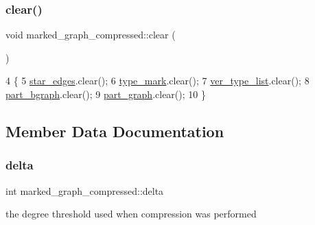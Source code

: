 \mbox{\label{classmarked__graph__compressed_af58307bfadcaa4c3ca6dd594c2f9b3a9}} 
\subsubsection{\texorpdfstring{clear()}{clear()}}
{\footnotesize\ttfamily void marked\+\_\+graph\+\_\+compressed\+::clear (\begin{DoxyParamCaption}{ }\end{DoxyParamCaption})}


\begin{DoxyCode}
4 \{
5   \hyperlink{classmarked__graph__compressed_a7df5779d313486644132bd816937f532}{star\_edges}.clear();
6   \hyperlink{classmarked__graph__compressed_a86b00223525703e973415cbc9c94da68}{type\_mark}.clear();
7   \hyperlink{classmarked__graph__compressed_af2e3e55223d436628a02758dfae88493}{ver\_type\_list}.clear();
8   \hyperlink{classmarked__graph__compressed_a7b3267063fba30b45eb21b3ba4e07536}{part\_bgraph}.clear();
9   \hyperlink{classmarked__graph__compressed_ae179a4737e6eab905c18a94d44ef64b7}{part\_graph}.clear();
10 \}
\end{DoxyCode}


\subsection{Member Data Documentation}
\mbox{\label{classmarked__graph__compressed_a8b2aaac68e9332ddc78d88eb60b323a7}} 
\subsubsection{\texorpdfstring{delta}{delta}}
{\footnotesize\ttfamily int marked\+\_\+graph\+\_\+compressed\+::delta}



the degree threshold used when compression was performed 

\mbox{\label{classmarked__graph__compressed_af6ff623407b673d08d0cab77b39c2193}} 

